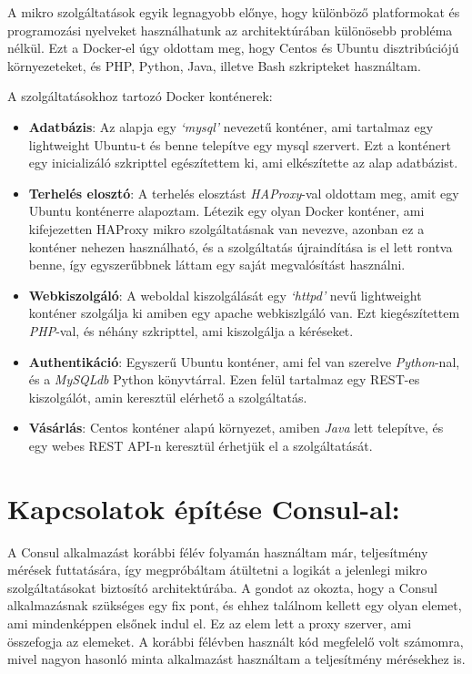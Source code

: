 \documentclass[11pt,magyar,a4paper,oneside,]{report}
\begin{document}
A mikro szolgáltatások egyik legnagyobb előnye, hogy különböző
platformokat és programozási nyelveket használhatunk az architektúrában
különösebb probléma nélkül. Ezt a Docker-el úgy oldottam meg, hogy
Centos és Ubuntu disztribúciójú környezeteket, és PHP, Python, Java,
illetve Bash szkripteket használtam.

A szolgáltatásokhoz tartozó Docker konténerek:

\begin{itemize}
\itemsep1pt\parskip0pt
\item
  \textbf{Adatbázis}: Az alapja egy \emph{`mysql'} nevezetű konténer,
  ami tartalmaz egy lightweight Ubuntu-t és benne telepítve egy mysql
  szervert. Ezt a konténert egy inicializáló szkripttel egészítettem ki,
  ami elkészítette az alap adatbázist.
\item
  \textbf{Terhelés elosztó}: A terhelés elosztást \emph{HAProxy}-val
  oldottam meg, amit egy Ubuntu konténerre alapoztam. Létezik egy olyan
  Docker konténer, ami kifejezetten HAProxy mikro szolgáltatásnak van
  nevezve, azonban ez a konténer nehezen használható, és a szolgáltatás
  újraindítása is el lett rontva benne, így egyszerűbbnek láttam egy
  saját megvalósítást használni.
\item
  \textbf{Webkiszolgáló}: A weboldal kiszolgálását egy \emph{`httpd'}
  nevű lightweight konténer szolgálja ki amiben egy apache webkiszlgáló
  van. Ezt kiegészítettem \emph{PHP}-val, és néhány szkripttel, ami
  kiszolgálja a kéréseket.
\item
  \textbf{Authentikáció}: Egyszerű Ubuntu konténer, ami fel van szerelve
  \emph{Python}-nal, és a \emph{MySQLdb} Python könyvtárral. Ezen felül
  tartalmaz egy REST-es kiszolgálót, amin keresztül elérhető a
  szolgáltatás.
\item
  \textbf{Vásárlás}: Centos konténer alapú környezet, amiben \emph{Java}
  lett telepítve, és egy webes REST API-n keresztül érhetjük el a
  szolgáltatását.
\end{itemize}

\section{Kapcsolatok építése
Consul-al:}\label{kapcsolatok-uxe9puxedtuxe9se-consul-al}

A Consul alkalmazást korábbi félév folyamán használtam már, teljesítmény
mérések futtatására, így megpróbáltam átültetni a logikát a jelenlegi
mikro szolgáltatásokat biztosító architektúrába. A gondot az okozta,
hogy a Consul alkalmazásnak szükséges egy fix pont, és ehhez találnom
kellett egy olyan elemet, ami mindenképpen elsőnek indul el. Ez az elem
lett a proxy szerver, ami összefogja az elemeket. A korábbi félévben
használt kód megfelelő volt számomra, mivel nagyon hasonló minta
alkalmazást használtam a teljesítmény mérésekhez is.
\end{document}
